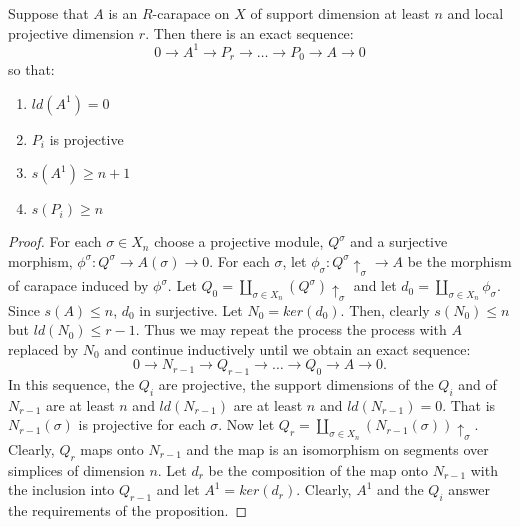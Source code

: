 \begin{propo}
Suppose that $A$ is an $R$-carapace on $X$ of support dimension at least $n$ and local projective dimension $r$. Then  there is an exact sequence:
\begin{equation}\label{art6-equation-4.3}
0 \rightarrow A^{1} \rightarrow P_{r}\rightarrow\ldots \rightarrow P_{0} \rightarrow A \rightarrow 0
\end{equation}
so that:
    \begin{enumerate}[(1)]
    \item $ld(A^{1}) = 0$\label{art6-equation-enum-1}
    \item $P_{i}$ is projective\label{art6-equation-enum-2}
    \item $s(A^{1})\geq n+1$\label{art6-equation-enum-3}
    \item $s(P_{i}) \geq n$\label{art6-equation-enum-4}
    \end{enumerate}
\end{propo}

\begin{proof}
For each $\sigma \in X_{n}$ choose a projective module, $Q^{\sigma}$ and a surjective morphism, $\phi^{\sigma} : Q^{\sigma} \rightarrow A(\sigma)\rightarrow 0$. For each $\sigma$, let $\phi_{\sigma} : Q^{\sigma}\uparrow_{\sigma} \rightarrow A$ be the morphism of carapace induced by $\phi^{\sigma}$. Let $Q_{0}= \coprod_{\sigma\in X_{n}}(Q^{\sigma})\uparrow_{\sigma}$ and let $d_{0}=\coprod_{\sigma \in X_{n}}\phi_{\sigma}$. Since $s(A)\leq n$, $d_{0}$ in surjective. Let $N_{0} =ker(d_{0})$. Then, clearly $s(N_{0}) \leq n$ but $ld(N_{0})\leq r-1$. Thus we may repeat the process the process with $A$ replaced by $N_{0}$ and continue inductively until we obtain an exact sequence:
$$
0 \rightarrow N_{r-1} \rightarrow Q_{r-1} \rightarrow\ldots \rightarrow Q_{0} \rightarrow A \rightarrow 0.
$$
In this sequence, the $Q_{i}$ are projective, the support dimensions of the $Q_{i}$ and of $N_{r-1}$ are at least $n$ and $ld(N_{r-1})$ are at least $n$ and $ld(N_{r-1})=0$. That is $N_{r-1}(\sigma)$ is projective for each $\sigma$. Now let $Q_{r}=\coprod_{\sigma \in X_{n}}(N_{r-1}(\sigma))\uparrow_{\sigma}$. Clearly, $Q_{r}$ maps onto $N_{r-1}$ and the map is an isomorphism on segments over simplices of dimension $n$. Let $d_{r}$ be the composition of the map onto $N_{r-1}$ with the inclusion into $Q_{r-1}$ and let $A^{1} =ker(d_{r})$. Clearly, $A^{1}$ and the $Q_{i}$ answer the requirements of the proposition.
\end{proof}

